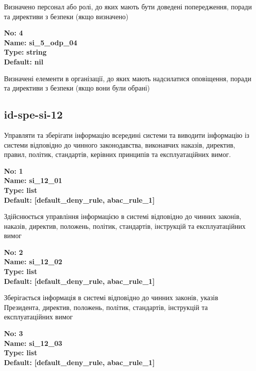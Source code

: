 \documentclass{article}
\begin{document}
{\footnotesize Визначено персонал або ролі, до яких мають бути доведені попередження, поради та директиви з безпеки (якщо визначено)}


{\footnotesize\bfseries
No: 4\\
Name: si\_\allowbreak{}5\_\allowbreak{}odp\_\allowbreak{}04\\
Type: string\\
Default: nil
}

{\footnotesize Визначені елементи в організації, до яких мають надсилатися оповіщення, поради та директиви з безпеки (якщо вони були обрані)}




\subsection{id-spe-si-12}
Управляти та зберігати інформацію всередині системи та виводити інформацію із системи відповідно до чинного законодавства, виконавчих наказів, директив, правил, політик, стандартів, керівних принципів та експлуатаційних вимог.

\vspace{10pt}
{\footnotesize\bfseries
No: 1\\
Name: si\_\allowbreak{}12\_\allowbreak{}01\\
Type: list\\
Default: [\textquotedbl{}default\_\allowbreak{}deny\_\allowbreak{}rule\textquotedbl{}, \textquotedbl{}abac\_\allowbreak{}rule\_\allowbreak{}1\textquotedbl{}]
}

{\footnotesize Здійснюється управління інформацією в системі відповідно до чинних законів, наказів, директив, положень, політик, стандартів, інструкцій та експлуатаційних вимог}


{\footnotesize\bfseries
No: 2\\
Name: si\_\allowbreak{}12\_\allowbreak{}02\\
Type: list\\
Default: [\textquotedbl{}default\_\allowbreak{}deny\_\allowbreak{}rule\textquotedbl{}, \textquotedbl{}abac\_\allowbreak{}rule\_\allowbreak{}1\textquotedbl{}]
}

{\footnotesize Зберігається інформація в системі відповідно до чинних законів, указів Президента, директив, положень, політик, стандартів, інструкцій та експлуатаційних вимог}


{\footnotesize\bfseries
No: 3\\
Name: si\_\allowbreak{}12\_\allowbreak{}03\\
Type: list\\
Default: [\textquotedbl{}default\_\allowbreak{}deny\_\allowbreak{}rule\textquotedbl{}, \textquotedbl{}abac\_\allowbreak{}rule\_\allowbreak{}1\textquotedbl{}]
}
\end{document}
